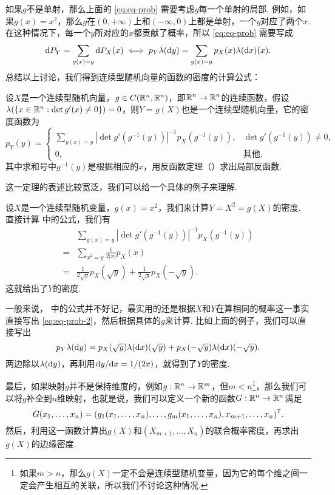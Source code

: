 如果$g$不是单射，那么上面的 \eqref{eq:eq-prob} 需要考虑$g$每一个单射的局部. 例如，如果$g(x)=x^2$，那么$g$在$(0,+\infty)$上和$(-\infty,0)$上都是单射，一个$y$对应了两个$x$. 在这种情况下，每一个$y$所对应的$x$都贡献了概率，所以 \eqref{eq:eq-prob} 需要写成
\begin{equation}
    \mathrm{d} P_Y=\sum_{g(x)=y}\mathrm{d} P_X(x)\iff p_Y\lambda(\mathrm{d} y)=\sum_{g(x)=y}p_X(x)\lambda(\mathrm{d} x)(x).\label{eq:eq-prob-2}
\end{equation}
总结以上讨论，我们得到连续型随机向量的函数的密度的计算公式：

\begin{theorem}\label{thm:continuous-function}
设$X$是一个连续型随机向量，$g\in C(\mathbb{R}^n,\mathbb{R}^n)$，即$\mathbb{R}^n\to\mathbb{R}^n$的连续函数，假设$\lambda(\{x\in\mathbb{R}^n:\det g'(x)\neq 0\})=0$，则$Y=g(X)$也是一个连续型随机向量，它的密度函数为
\[p_Y(y)=\begin{cases}
    \sum_{g(x)=y}|\det g'(g^{-1}(y))|^{-1}p_X(g^{-1}(y)),&\det g'(g^{-1}(y))\neq 0,\\
    0,&\text{其他}.
\end{cases}\]
其中求和号中$g^{-1}(y)$是根据相应的$x$，用反函数定理（）求出局部反函数. 
\end{theorem}

这一定理的表述比较宽泛，我们可以给一个具体的例子来理解. 

\begin{example}
设$X$是一个连续型随机变量，$g(x)=x^2$，我们来计算$Y=X^2=g(X)$的密度. 直接计算 中的公式，我们有
\begin{align*}
    &\sum_{g(x)=y}|\det g'(g^{-1}(y))|^{-1}p_X(g^{-1}(y))\\
    =&\sum_{x^2=y}\frac{1}{2|x|}p_X(x)\\
    =&\frac{1}{2\sqrt{y}}p_X(\sqrt{y})+\frac{1}{2\sqrt{y}}p_X(-\sqrt{y}).
\end{align*}
这就给出了$Y$的密度. 
\end{example}

一般来说， 中的公式并不好记，最实用的还是根据$X$和$Y$在算相同的概率这一事实直接写出 \eqref{eq:eq-prob-2}，然后根据具体的$g$来计算. 比如上面的例子，我们可以直接写出
\[p_Y\lambda(\mathrm{d} y)=p_X(\sqrt{y})\lambda(\mathrm{d} x)(\sqrt{y})+p_X(-\sqrt{y})\lambda(\mathrm{d} x)(-\sqrt{y}).\]
两边除以$\lambda(\mathrm{d} y)$，再利用$\mathrm{d} y/\mathrm{d} x=1/(2x)$，就得到了$Y$的密度. 

最后，如果映射$g$并不是保持维度的，例如$g:\mathbb{R}^n\to\mathbb{R}^m$，但$m<n$\footnote{如果$m>n$，那么$g(X)$一定不会是连续型随机变量，因为它的每个维之间一定会产生相互的关联，所以我们不讨论这种情况. }，那么我们可以将$g$补全到$n$维映射，也就是说，我们可以定义一个新的函数$G:\mathbb{R}^n\to\mathbb{R}^n$满足
\[G(x_1,\dots,x_n)=(g_1(x_1,\dots,x_n),\dots,g_m(x_1,\dots,x_n),x_{m+1},\dots,x_n)^{\mathsf{T}}.\]
然后，利用这一函数计算出$g(X)$和$(X_{m+1},\dots,X_n)$的联合概率密度，再求出$g(X)$的边缘密度. 

